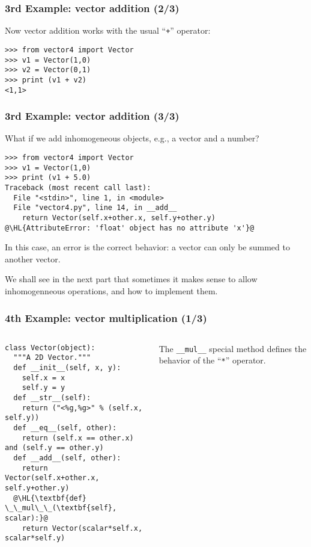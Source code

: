 \documentclass[english,serif,mathserif,xcolor=pdftex,dvipsnames,table]{beamer}
\begin{document}
\begin{frame}[fragile]
  \frametitle{3rd Example: vector addition (2/3)}

  Now vector addition works with the usual ``\texttt{+}'' operator:
\begin{lstlisting}
>>> from vector4 import Vector
>>> v1 = Vector(1,0)
>>> v2 = Vector(0,1)
>>> print (v1 + v2)
<1,1>
\end{lstlisting}
\end{frame}


\begin{frame}[fragile]
  \frametitle{3rd Example: vector addition (3/3)}

  What if we add inhomogeneous objects, e.g., a vector and a number?
\begin{lstlisting}
>>> from vector4 import Vector
>>> v1 = Vector(1,0)
>>> print (v1 + 5.0)
Traceback (most recent call last):
  File "<stdin>", line 1, in <module>
  File "vector4.py", line 14, in __add__
    return Vector(self.x+other.x, self.y+other.y)
@\HL{AttributeError: 'float' object has no attribute 'x'}@
\end{lstlisting}

  \+ In this case, an error is the correct behavior: a vector can only
  be summed to another vector.

  \+ We shall see in the next part that sometimes it makes sense to
  allow inhomogenneous operations, and how to implement them.
\end{frame}

\begin{frame}[fragile]
  \frametitle{4th Example: vector multiplication (1/3)}
  \begin{columns}[t]
    \begin{column}{0.5\textwidth}
\begin{lstlisting}
class Vector(object):
  """A 2D Vector."""
  def __init__(self, x, y):
    self.x = x
    self.y = y
  def __str__(self):
    return ("<%g,%g>" % (self.x, self.y))
  def __eq__(self, other):
    return (self.x == other.x) and (self.y == other.y)
  def __add__(self, other):
    return Vector(self.x+other.x, self.y+other.y)
  @\HL{\textbf{def} \_\_mul\_\_(\textbf{self}, scalar):}@
    return Vector(scalar*self.x, scalar*self.y)
\end{lstlisting}
    \end{column}
    \begin{column}{0.5\textwidth}
      \raggedleft
      The \lstinline|__mul__| special method defines the behavior of
      the ``\texttt{*}'' operator.
    \end{column}
  \end{columns}
\end{frame}
\end{document}
